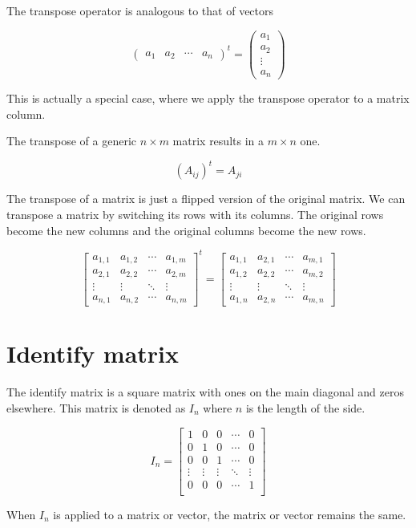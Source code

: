 \documentclass{article}
\begin{document}
The transpose operator is analogous to that of vectors

\[
    \begin{pmatrix}
        a_1 & a_2 & \cdots & a_n
    \end{pmatrix}^t
    =
    \begin{pmatrix}
        a_1 \\
        a_2 \\
        \vdots \\
        a_n
    \end{pmatrix}
\]

This is actually a special case, where we apply the transpose operator to a matrix column.

The transpose of a generic \(n \times m\) matrix results in a \(m \times n\) one.

\[
    {\left(A_{ij}\right)}^t=A_{ji}
\]

The transpose of a matrix is just a flipped version of the original matrix.
We can transpose a matrix by switching its rows with its columns.
The original rows become the new columns and the original columns become the new rows.

\[
    {\begin{bmatrix} 
        a_{1,1} & a_{1,2} & \cdots & a_{1,m} \\
        a_{2,1} & a_{2,2} & \cdots & a_{2,m} \\
        \vdots  & \vdots  & \ddots & \vdots  \\
        a_{n,1} & a_{n,2} & \cdots & a_{n,m} 
    \end{bmatrix}}^t
    =
    \begin{bmatrix} 
        a_{1,1} & a_{2,1} & \cdots & a_{m,1} \\
        a_{1,2} & a_{2,2} & \cdots & a_{m,2} \\
        \vdots  & \vdots  & \ddots & \vdots  \\
        a_{1,n} & a_{2,n} & \cdots & a_{m,n} 
    \end{bmatrix}
\]

\pagebreak

\section{Identify matrix}

The identify matrix is a square matrix with ones on the main diagonal and zeros elsewhere.
This matrix is denoted as \(I_n\) where \(n\) is the length of the side.

\[
    I_n=
    \begin{bmatrix}
        1 & 0 & 0 & \cdots & 0 \\
        0 & 1 & 0 & \cdots & 0 \\
        0 & 0 & 1 & \cdots & 0 \\
        \vdots & \vdots & \vdots & \ddots & \vdots \\
        0 & 0 & 0 & \cdots & 1 \\
    \end{bmatrix}
\]

When \(I_n\) is applied to a matrix or vector, the matrix or vector remains the same.

\end{document}
